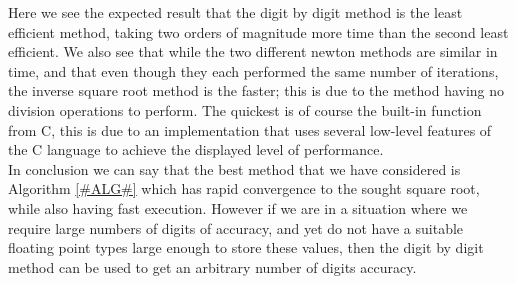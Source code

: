 Here we see the expected result that the digit by digit method is the least efficient method, taking two orders of magnitude more time than the second least efficient. We also see that while the two different newton methods are similar in time, and that even though they each performed the same number of iterations, the inverse square root method is the faster; this is due to the method having no division operations to perform. The quickest is of course the built-in  function from C, this is due to an implementation that uses several low-level features of the C language to achieve the displayed level of performance.\\

In conclusion we can say that the best method that we have considered is Algorithm \ref{#ALG#} which has rapid convergence to the sought square root, while also having fast execution. However if we are in a situation where we require large numbers of digits of accuracy, and yet do not have a suitable floating point types large enough to store these values, then the digit by digit method can be used to get an arbitrary number of digits accuracy.
